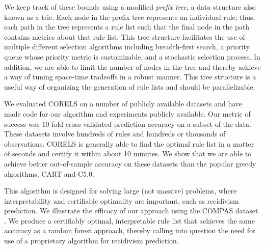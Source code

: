 We keep track of these bounds using a modified \emph{prefix tree},
a data structure also known as a trie.
%
Each node in the prefix tree represents an individual rule;
thus, each path in the tree represents a rule list such that
the final node in the path contains metrics about that rule list.
%
This tree structure facilitates the use of multiple different selection algorithms including breadth-first search, a priority queue whose priority metric is customizable, and a stochastic selection process. In addition, we are able to limit the number of nodes in the tree and thereby achieve a way of tuning space-time tradeoffs in a robust manner. This tree structure is a useful way of organizing the generation of rule lists and should be parallelizable.

\begin{arxiv}
We evaluated CORELS on a number of publicly available datasets and have made code for our algorithm and experiments publicly available. Our metric of success was 10-fold cross validated prediction accuracy on a subset of the data. These datasets involve hundreds of rules and hundreds or thousands of observations. CORELS is generally able to find the optimal rule list in a matter of seconds and certify it within about 10 minutes. We show that we are able to achieve better out-of-sample accuracy on these datasets than the popular greedy algorithms, CART and C5.0.
\end{arxiv}

This algorithm is designed for solving large (not massive) problems, where interpretability and certifiable optimality are important, such as recidivism prediction. We illustrate the efficacy of our approach using the COMPAS dataset \cite{LarsonMaKiAn16}. We produce a certifiably optimal, interpretable rule list that achieves the same accuracy as a random forest approach, thereby calling into question the need for use of a proprietary algorithm for recidivism prediction.

%
%
%
%
